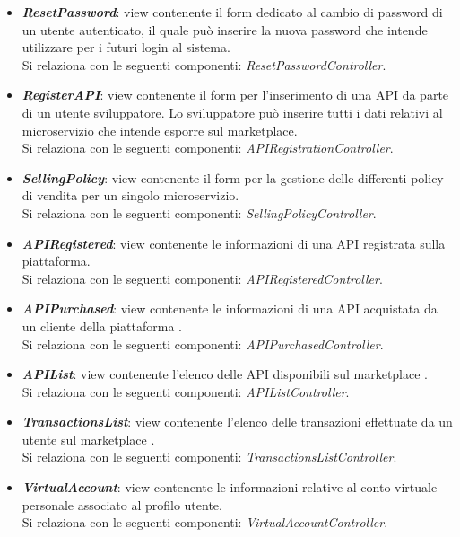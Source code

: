 \begin{itemize}
\begin{itemize}
		\item \textbf{\textit{ResetPassword}}: view contenente il form dedicato al cambio di password di un utente autenticato, il quale può inserire la nuova password che intende utilizzare per i futuri login al sistema.\\
		Si relaziona con le seguenti componenti: \textit{ResetPasswordController}.
		
		\item \textbf{\textit{RegisterAPI}}: view contenente il form per l'inserimento di una API da parte di un utente sviluppatore. Lo sviluppatore può inserire tutti i dati relativi al microservizio che intende esporre sul marketplace.\\
		Si relaziona con le seguenti componenti: \textit{APIRegistrationController}.
		
		\item \textbf{\textit{SellingPolicy}}: view contenente il form per la gestione delle differenti policy di vendita per un singolo microservizio.\\
		Si relaziona con le seguenti componenti: \textit{SellingPolicyController}.
		
		\item \textbf{\textit{APIRegistered}}: view contenente le informazioni di una API registrata sulla piattaforma.\\
		Si relaziona con le seguenti componenti: \textit{APIRegisteredController}.
		
		\item \textbf{\textit{APIPurchased}}: view contenente le informazioni di una API acquistata da un cliente della piattaforma \progetto.\\
		Si relaziona con le seguenti componenti: \textit{APIPurchasedController}.
		
		\item \textbf{\textit{APIList}}: view contenente l'elenco delle API disponibili sul marketplace \progetto.\\
		Si relaziona con le seguenti componenti: \textit{APIListController}.
		
		\item \textbf{\textit{TransactionsList}}: view contenente l'elenco delle transazioni effettuate da un utente sul marketplace \progetto.\\
		Si relaziona con le seguenti componenti: \textit{TransactionsListController}.
		
		\item \textbf{\textit{VirtualAccount}}: view contenente le informazioni relative al conto virtuale personale associato al profilo utente.\\
		Si relaziona con le seguenti componenti: \textit{VirtualAccountController}.
		

\end{itemize}
\end{itemize}
